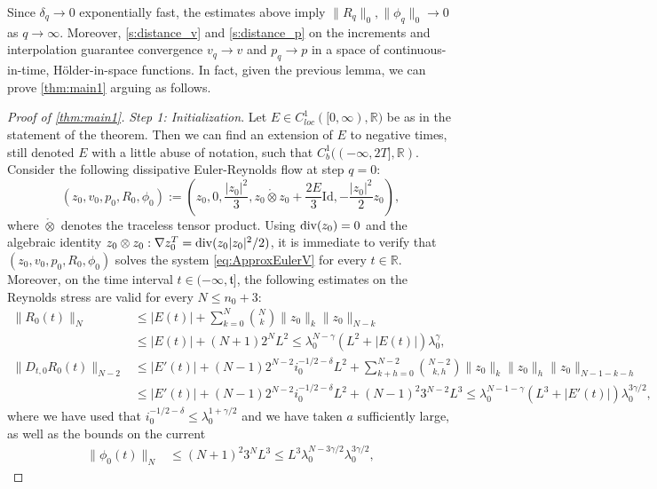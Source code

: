 \documentclass[10pt,a4paper]{amsart}
\numberwithin{equation}{section}
\numberwithin{corollario}{section}
\numberwithin{lemma}{section}
\numberwithin{prop}{section}
\theoremstyle{definition}
\theoremstyle{remark}
\newcommand{\R}{\mathbb{R}}
\newcommand{\dvg}{\mathord{{\rm div}}}
\newcommand{\Id}{\mathrm{Id}}
\begin{document}
Since $\delta_q \to 0$ exponentially fast, the estimates above imply $\|R_q\|_0,\|\phi_q\|_0 \to 0$ as $q \to \infty$.
Moreover, \eqref{s:distance_v} and \eqref{s:distance_p} on the increments and interpolation guarantee convergence $v_q \to v$ and $p_q \to p$ in a space of continuous-in-time, H\"older-in-space functions.
In fact, given the previous lemma, we can prove \autoref{thm:main1} arguing as follows.

\begin{proof}[Proof of \autoref{thm:main1}]
\textit{Step 1: Initialization}.
Let $E \in C^1_{loc}([0,\infty),\R)$ be as in the statement of the theorem. Then we can find an extension of $E$ to negative times, still denoted $E$ with a little abuse of notation, such that $C^1_b((-\infty,2T],\R)$. 
Consider the following dissipative Euler-Reynolds flow at step $q=0$: 
\begin{equation}
    (z_0,v_0,p_0,R_0,\phi_0):=\left(z_0,0,\frac{|z_0|^2}{3},z_0\mathring{\otimes}z_0+\frac{2E}{3}\Id, -\frac{|z_0|^2}{2}z_0\right),
\end{equation}
where $\mathring{\otimes}$ denotes the traceless tensor product.
Using $\dvg (z_0)=0$ and the algebraic identity $z_0\otimes z_0:\nabla z_0^T = \dvg(z_0 |z_0|^2/2)$, it is immediate to verify that $(z_0,v_0,p_0,R_0,\phi_0)$ solves the system \eqref{eq:ApproxEulerV} for every $t \in \R$.
Moreover, on the time interval $t \in (-\infty,\mathfrak{t}]$, the following estimates on the Reynolds stress are valid for every $N \leq n_0+3$:
\begin{align}
    \|R_0(t)\|_N
    &\leq 
    |E(t)|  + \sum_{k=0}^N \binom{N}{k}\|z_0\|_k \|z_0\|_{N-k}
    \\
    &\leq
    |E(t)| + (N+1)2^N L^2
    \le \lambda_0^{N-\gamma}(L^2+|E(t)|) \lambda_0^\gamma,
    \\
    \|D_{t,0}R_0(t)\|_{N-2} 
    &\leq 
    |E'(t)|
    +
    (N-1)2^{N-2} i_0^{-1/2-\delta}L^2 
    + 
    \sum_{k + h = 0}^{N-2} \binom{N-2}{k,h} \|z_0\|_k \|z_0\|_{h} \|z_0\|_{N-1-k-h}
    \\
    &\le
    |E'(t)|
    +
    (N-1)2^{N-2} i_0^{-1/2-\delta}L^2
    +
    (N-1)^2 3^{N-2} L^3
    \leq 
    \lambda_0^{N-1-\gamma} (L^3+|E'(t)|) \lambda_0^{3\gamma/2} ,
    \end{align}
 where we have used that $i_0^{-1/2-\delta}\le \lambda_0^{1+\gamma/2}$ and we have taken $a$ sufficiently large,
 as well as the bounds on the current
    \begin{align}
    \|\phi_0(t)\|_N
    &\leq
    (N+1)^2 3^N L^3\le L^3 \lambda_0^{N-3\gamma/2}\lambda_0^{3\gamma/2},

\end{align}
\end{proof}
\end{document}
